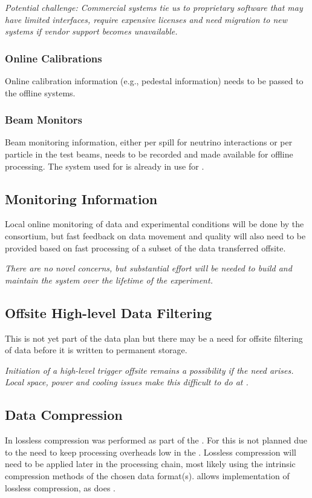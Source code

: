 \documentclass[../main-v1.tex]{subfiles}
\begin{document}
{\it Potential challenge: Commercial  systems tie us to proprietary software that may have limited interfaces, require expensive licenses and need migration to new systems if %
vendor support becomes unavailable.}

\subsubsection{Online Calibrations}
Online calibration information (e.g., pedestal information) needs to be passed to the offline systems. 


\subsubsection{Beam Monitors}
Beam monitoring information, either per spill for neutrino interactions or per particle in the  test beams, needs to be recorded and made available for offline processing. 
The  system used for  is already in use for .

\subsection{Monitoring Information} 
Local online monitoring of data and experimental conditions will be done by the  %
consortium, but fast feedback on data movement and quality will also need to be provided based on fast processing of a subset of the data transferred offsite. 

{\it There are no novel concerns, but substantial effort will be needed to build and maintain the system over the lifetime of the experiment.}

\subsection{Offsite High-level Data Filtering}

This is not yet part of the data plan but there may be a need for offsite filtering of data before %
it is written to permanent storage. 

{\it  Initiation of a high-level trigger offsite remains a possibility if the need arises. Local space, power and cooling issues make this difficult to do at .}

\subsection{Data Compression}
In  lossless compression was performed as part of the . For  this is not planned due to the need to keep processing overheads low in the . Lossless compression will need to be applied later in the processing chain, most likely using the intrinsic compression methods of the chosen data format(s).   allows implementation of lossless compression, as does .
\end{document}
